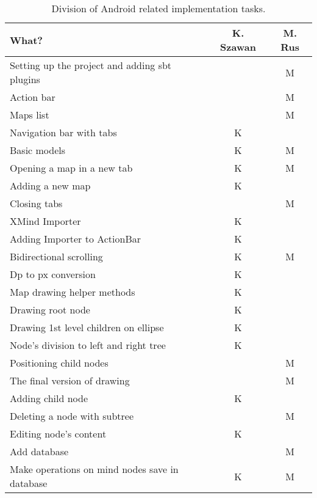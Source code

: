 \begin{table}[h]
	\centering
	\begin{tabular}{l|c|c}
		What? & K. Szawan & M. Rus \\
		\hline
		Setting up the project and adding sbt plugins &  & M \\
		Action bar & & M\\
		Maps list & & M\\
		Navigation bar with tabs & K & \\
		Basic models & K & M\\
		Opening a map in a new tab & K & M\\
		Adding a new map & K & \\
		Closing tabs & & M\\
		XMind Importer & K & \\
		Adding Importer to ActionBar & K & \\
	    Bidirectional scrolling & K & M \\
	    Dp to px conversion & K & \\
	    Map drawing helper methods  & K & \\
	    Drawing root node & K & \\
	    Drawing 1st level children on ellipse & K & \\
	    Node's division to left and right tree & K & \\
	    Positioning child nodes & & M \\
	    The final version of drawing & & M \\
	    Adding child node & K & \\
	    Deleting a node with subtree &  & M \\
	    Editing node's content &  K & \\
	    Add database &  & M \\
	    Make operations on mind nodes save in database & K & M \\
	\end{tabular}
	\caption{Division of Android related implementation tasks.}
	\label{tab:who-did-impl}
\end{table}

